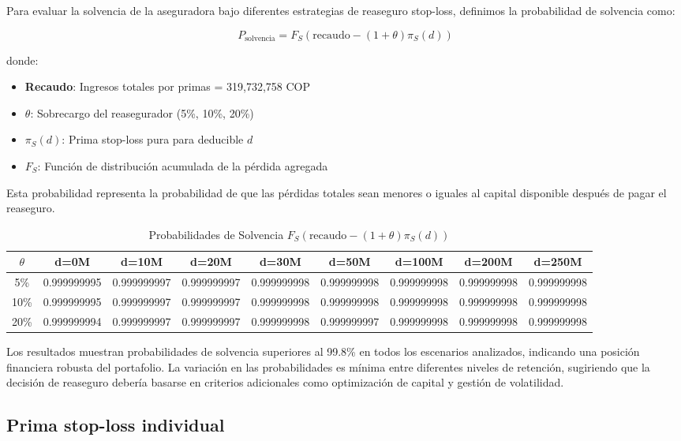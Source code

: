 Para evaluar la solvencia de la aseguradora bajo diferentes estrategias de reaseguro stop-loss, definimos la probabilidad de solvencia como:

$$P_{\text{solvencia}} = F_S(\text{recaudo} - (1+\theta)\pi_S(d))$$

donde:
\begin{itemize}
\item \textbf{Recaudo}: Ingresos totales por primas = 319,732,758 COP
\item \textbf{$\theta$}: Sobrecargo del reasegurador (5\%, 10\%, 20\%)
\item \textbf{$\pi_S(d)$}: Prima stop-loss pura para deducible $d$
\item \textbf{$F_S$}: Función de distribución acumulada de la pérdida agregada
\end{itemize}

Esta probabilidad representa la probabilidad de que las pérdidas totales sean menores o iguales al capital disponible después de pagar el reaseguro.

\begin{table}[H]
\centering
\caption{Probabilidades de Solvencia $F_S(\text{recaudo} - (1+\theta)\pi_S(d))$}
\scriptsize
\begin{tabular}{ccccccccc}
\hline
\textbf{$\theta$} & \textbf{d=0M} & \textbf{d=10M} & \textbf{d=20M} & \textbf{d=30M} & \textbf{d=50M} & \textbf{d=100M} & \textbf{d=200M} & \textbf{d=250M} \\
\hline
5\% & 0.999999995 & 0.999999997 & 0.999999997 & 0.999999998 & 0.999999998 & 0.999999998 & 0.999999998 & 0.999999998 \\
10\% & 0.999999995 & 0.999999997 & 0.999999997 & 0.999999998 & 0.999999998 & 0.999999998 & 0.999999998 & 0.999999998 \\
20\% & 0.999999994 & 0.999999997 & 0.999999997 & 0.999999998 & 0.999999997 & 0.999999998 & 0.999999998 & 0.999999998 \\
\hline
\end{tabular}
\end{table}

Los resultados muestran probabilidades de solvencia superiores al 99.8\% en todos los escenarios analizados, indicando una posición financiera robusta del portafolio. La variación en las probabilidades es mínima entre diferentes niveles de retención, sugiriendo que la decisión de reaseguro debería basarse en criterios adicionales como optimización de capital y gestión de volatilidad.

\subsection{Prima stop-loss individual}


